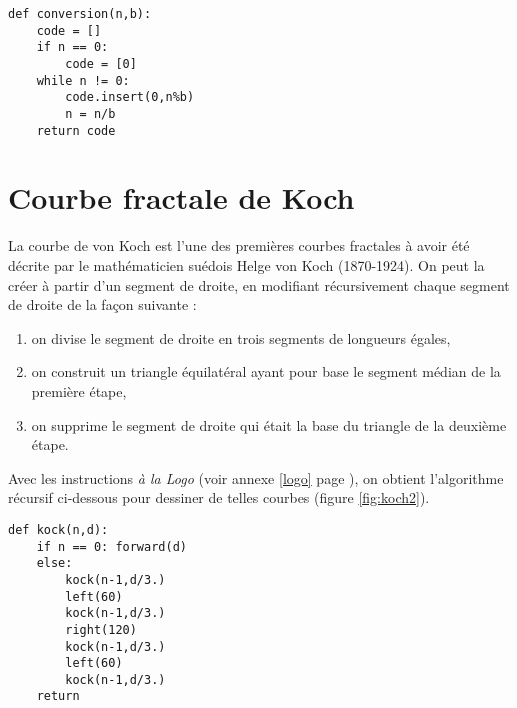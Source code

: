 \begin{lstlisting}[caption={\bf Conversion en base $b$},label=cl:conversion]
def conversion(n,b):
    code = []
    if n == 0:
        code = [0]
    while n != 0:
        code.insert(0,n%b)
        n = n/b
    return code
\end{lstlisting}


\section*{Courbe fractale de Koch}

La courbe de von Koch  est l'une des premières courbes 
fractales à avoir été décrite par le mathématicien suédois Helge von Koch (1870-1924).
On peut la créer à partir d'un segment de droite, en modifiant récursivement 
chaque segment de droite de la façon suivante :
\begin{enumerate}
\item on divise le segment de droite en trois segments de longueurs égales,
\item on construit un triangle équilatéral ayant pour base le segment médian 
	de la première étape,
\item on supprime le segment de droite qui était la base du triangle 
	de la deuxième étape.
\end{enumerate}
Avec les instructions {\em à la {\sc Logo}} (voir annexe \ref{logo}
page \pageref{logo}), on obtient l'algorithme récursif ci-dessous
pour dessiner de telles courbes (figure \ref{fig:koch2}).

\begin{lstlisting}[caption={\bf Courbe fractale de Koch},label=cl:fractal]
def kock(n,d):
    if n == 0: forward(d)
    else:
        kock(n-1,d/3.)
        left(60)
        kock(n-1,d/3.)
        right(120)
        kock(n-1,d/3.)
        left(60)
        kock(n-1,d/3.)
    return
\end{lstlisting}

